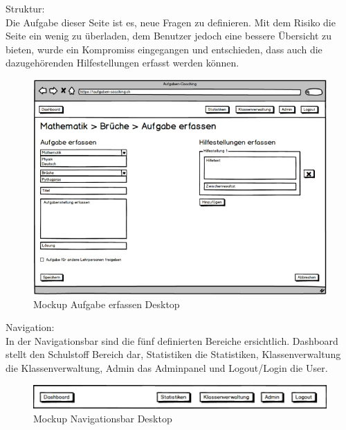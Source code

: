 Struktur: \\
Die Aufgabe dieser Seite ist es, neue Fragen zu definieren. Mit dem Risiko die Seite ein wenig zu überladen, dem Benutzer jedoch eine bessere Übersicht zu bieten, wurde ein Kompromiss eingegangen und entschieden, dass auch die dazugehörenden Hilfestellungen erfasst werden können. \\
\begin{minipage}{\textwidth}
	\begin{figure}[H]
	\centering
		\includegraphics[width=\textwidth, keepaspectratio]{images/Mockups/AufgabeErfassen_Desktop.png}
		\caption{Mockup Aufgabe erfassen Desktop}
	\end{figure}
\end{minipage}


Navigation: \\
In der Navigationsbar sind die fünf definierten Bereiche ersichtlich. Dashboard stellt den Schulstoff Bereich dar, Statistiken die Statistiken, Klassenverwaltung die Klassenverwaltung, Admin das Adminpanel und Logout/Login die User. \\
\begin{minipage}{\textwidth}
	\begin{figure}[H]
	\centering
		\includegraphics[width=\textwidth, keepaspectratio]{images/Mockups/Navigationsleiste_Desktop.png}
		\caption{Mockup Navigationsbar Desktop}
	\end{figure}
\end{minipage}


